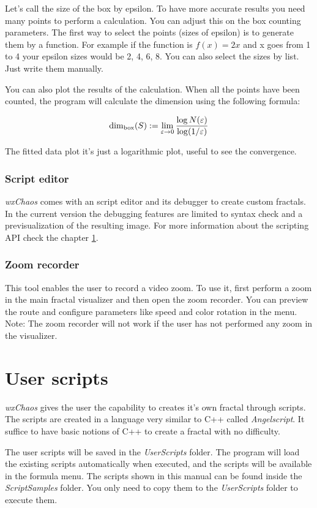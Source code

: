 \documentclass[oneside]{book}
\begin{document}
Let's call the size of the box by epsilon. To have more accurate results you need many points to perform a calculation. You can adjust this on the box counting parameters. The first way to select the points (sizes of epsilon) is to generate them by a function. For example if the function is $f(x) = 2x$ and x goes from 1 to 4 your epsilon sizes would be 2, 4, 6, 8. You can also select the sizes by list. Just write them manually.

You can also plot the results of the calculation. When all the points have been counted, the program will calculate the dimension using the following formula:

\[
	\dim_{\rm box}(S) := \lim_{\varepsilon \to 0} \frac {\log N(\varepsilon)}{\log (1/\varepsilon)}
\]

The fitted data plot it's just a logarithmic plot, useful to see the convergence.

\subsection{Script editor}
\textit{wxChaos} comes with an script editor and its debugger to create custom fractals. In the current version the debugging features are limited to syntax check and a previsualization of the resulting image. For more information about the scripting API check the chapter \ref{chap:scripts}.

\subsection{Zoom recorder}
This tool enables the user to record a video zoom. To use it, first perform a zoom in the main fractal visualizer and then open the zoom recorder. You can preview the route and configure parameters like speed and color rotation in the menu. Note: The zoom recorder will not work if the user has not performed any zoom in the visualizer.

\chapter{User scripts}
\label{chap:scripts}

\textit{wxChaos} gives the user the capability to creates it's own fractal through scripts. The scripts are created in a language very similar to C++ called \textit{Angelscript}. It suffice to have basic notions of C++ to create a fractal with no difficulty.

The user scripts will be saved in the \textit{UserScripts} folder. The program will load the existing scripts automatically when executed, and the scripts will be available in the formula menu. The scripts shown in this manual can be found inside the \textit{ScriptSamples} folder. You only need to copy them to the \textit{UserScripts} folder to execute them.
\end{document}
